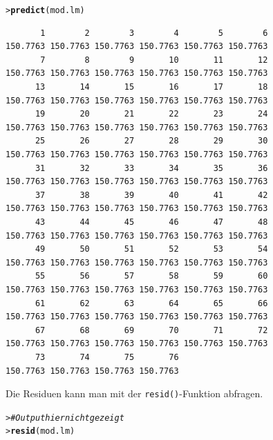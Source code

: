 \documentclass[oneside, 10pt]{book}\usepackage[]{graphicx}\usepackage[]{xcolor}
\makeatletter
\newcommand{\hlcom}[1]{\textcolor[rgb]{0.678,0.584,0.686}{\textit{#1}}}%
\newcommand{\hlstd}[1]{\textcolor[rgb]{0.345,0.345,0.345}{#1}}%
\newcommand{\hlkwd}[1]{\textcolor[rgb]{0.737,0.353,0.396}{\textbf{#1}}}%
\newenvironment{kframe}{%
 \def\at@end@of@kframe{}%
 \ifinner\ifhmode%
  \def\at@end@of@kframe{\end{minipage}}%
  \begin{minipage}{\columnwidth}%
 \fi\fi%
 \def\FrameCommand##1{\hskip\@totalleftmargin \hskip-\fboxsep
 \colorbox{shadecolor}{##1}\hskip-\fboxsep
     \hskip-\linewidth \hskip-\@totalleftmargin \hskip\columnwidth}%
 \MakeFramed {\advance\hsize-\width
   \@totalleftmargin\z@ \linewidth\hsize
   \@setminipage}}%
 {\par\unskip\endMakeFramed%
 \at@end@of@kframe}
\newenvironment{knitrout}{}{} %
\makeatother
\begin{document}
\begin{knitrout}
\color{fgcolor}\begin{kframe}
\begin{alltt}
\hlstd{> }\hlkwd{predict}\hlstd{(mod.lm)}
\end{alltt}
\begin{verbatim}
       1        2        3        4        5        6 
150.7763 150.7763 150.7763 150.7763 150.7763 150.7763 
       7        8        9       10       11       12 
150.7763 150.7763 150.7763 150.7763 150.7763 150.7763 
      13       14       15       16       17       18 
150.7763 150.7763 150.7763 150.7763 150.7763 150.7763 
      19       20       21       22       23       24 
150.7763 150.7763 150.7763 150.7763 150.7763 150.7763 
      25       26       27       28       29       30 
150.7763 150.7763 150.7763 150.7763 150.7763 150.7763 
      31       32       33       34       35       36 
150.7763 150.7763 150.7763 150.7763 150.7763 150.7763 
      37       38       39       40       41       42 
150.7763 150.7763 150.7763 150.7763 150.7763 150.7763 
      43       44       45       46       47       48 
150.7763 150.7763 150.7763 150.7763 150.7763 150.7763 
      49       50       51       52       53       54 
150.7763 150.7763 150.7763 150.7763 150.7763 150.7763 
      55       56       57       58       59       60 
150.7763 150.7763 150.7763 150.7763 150.7763 150.7763 
      61       62       63       64       65       66 
150.7763 150.7763 150.7763 150.7763 150.7763 150.7763 
      67       68       69       70       71       72 
150.7763 150.7763 150.7763 150.7763 150.7763 150.7763 
      73       74       75       76 
150.7763 150.7763 150.7763 150.7763 
\end{verbatim}
\end{kframe}
\end{knitrout}

Die Residuen kann man mit der \texttt{resid()}-Funktion abfragen.

\begin{knitrout}
\color{fgcolor}\begin{kframe}
\begin{alltt}
\hlstd{> }\hlcom{# Output hier nicht gezeigt}
\hlstd{> }\hlkwd{resid}\hlstd{(mod.lm)}
\end{alltt}
\end{kframe}
\end{knitrout}
\end{document}
